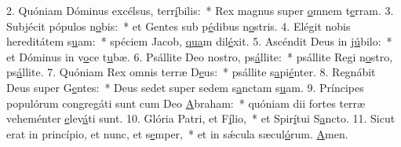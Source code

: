 2. Quóniam Dóminus excélsus, terr\uline{í}bilis:~* Rex magnus super \uline{o}mnem t\uline{e}rram.
3. Subjécit pópulos n\uline{o}bis:~* et Gentes sub p\uline{é}dibus n\uline{o}stris.
4. Elégit nobis hereditátem s\uline{u}am:~* spéciem Jacob, \uline{qua}m dil\uline{é}xit.
5. Ascéndit Deus in j\uline{ú}bilo:~* et Dóminus in v\uline{o}ce t\uline{u}bæ.
6. Psállite Deo nostro, ps\uline{á}llite:~* psállite Regi n\uline{o}stro, ps\uline{á}llite.
7. Quóniam Rex omnis terræ D\uline{e}us:~* psállite s\uline{a}pi\uline{é}nter.
8. Regnábit Deus super G\uline{e}ntes:~* Deus sedet super sedem s\uline{a}nctam s\uline{u}am.
9. Príncipes populórum congregáti sunt cum Deo \uline{A}braham:~* quóniam dii fortes terræ veheménter \uline{e}lev\uline{á}ti sunt.
10. Glória Patri, et F\uline{í}lio,~* et Spir\uline{í}tui S\uline{a}ncto.
11. Sicut erat in princípio, et nunc, et s\uline{e}mper,~* et in sǽcula sæcul\uline{ó}rum. \uline{A}men.
